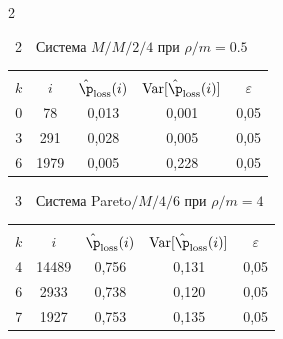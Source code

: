 \begin{multicols}{2}

\vspace*{6pt}

\addtocounter{figure}{1}

\noindent
\begin{center}  %
{{\tablename~2}\ \ \small{Система $M/M/2/4$  при $\rho/m=0.5$}}
\vspace*{2ex}

{\small 
\tabcolsep=6.4pt
\begin{tabular}{|c|c|c|c|c|} 
\hline
&&&&\\[-9pt]
 $k$ & $i$   &$\hat{\p}_{\mathrm{loss}}(i)$ &  $\mathrm{Var}[\hat{\p}_{\mathrm{loss}}(i)]$ & $\varepsilon$ \\
 \hline
0& \hphantom{9,}78\hphantom{9}& 0,013& 0,001& 0,05\\ 
3& 291& 0,028& 0,005& 0,05\\ 
6& 1979\hphantom{9}& 0,005& 0,228&0,05\\
 \hline
\end{tabular} 
}
\end{center}





\addtocounter{table}{1}


\noindent
\begin{center}  %
{{\tablename~3}\ \ \small{Система
Pareto$/M/4/6$  при $\rho/m=4$}}
\vspace*{2ex}

{\small 
\tabcolsep=7pt
\begin{tabular}{|c|c|c|c|c|}
\hline
&&&&\\[-9pt]
 $k$ & $i$   &$\hat{\p}_{\mathrm{loss}}(i)$ &  $\mathrm{Var}[\hat{\p}_{\mathrm{loss}}(i)]$ & $\varepsilon$ \\
 \hline
4& 14489\hphantom{9}& 0,756& 0,131& 0,05\\ 
6& 2933& 0,738& 0,120& 0,05\\ 
7& 1927& 0,753& 0,135& 0,05\\
 \hline
\end{tabular} 
}
\end{center}




\end{multicols}
